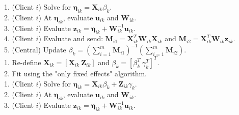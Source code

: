 \documentclass[
  12pt,
]{article}
\begin{document}
\begin{algorithm}[H]
   {
     {
         {
             {
                1. (Client $i$) Solve for $\boldsymbol{\eta}_{ik} = \boldsymbol{X}_{ik} \beta_k$. \\
                2. (Client $i$) At $\boldsymbol{\eta}_{ik}$, evaluate $\boldsymbol{u}_{ik}$ and $\boldsymbol{W}_{ik}$. \\
                3. (Client $i$) Evaluate $\boldsymbol{z}_{ik} = \boldsymbol{\eta}_{ik} + \boldsymbol{W}_{ik}^{-1} \boldsymbol{u}_{ik}$. \\
                4. (Client $i$) Evaluate and send: $\boldsymbol{M}_{i1} = \boldsymbol{X}_{ik}^T \boldsymbol{W}_{ik} \boldsymbol{X}_{ik}$ and $\boldsymbol{M}_{i2} = \boldsymbol{X}_{ik}^T 
 \boldsymbol{W}_{ik} \boldsymbol{z}_{ik}$. \\
                5. (Central) Update $\beta_k = (\sum_{i = 1}^m\boldsymbol{M}_{i1})^{-1}(\sum_{i = 1}^m\boldsymbol{M}_{i2})$. \\ 
            }
             {
                1. Re-define $\boldsymbol{X}_{ik} = [\boldsymbol{X}_{ik} \: \boldsymbol{Z}_{ik}]$ and $\beta_k = [\beta_k^T \: \gamma_k^T]^T$. \\
                2. Fit using the "only fixed effects" algorithm. \\
            }
             {
                1. (Client $i$) Solve for $\boldsymbol{\eta}_{ik} = \boldsymbol{X}_{ik} \beta_k + \boldsymbol{Z}_{ik} \gamma_k$. \\
                2. (Client $i$) At $\boldsymbol{\eta}_{ik}$, evaluate $\boldsymbol{u}_{ik}$ and $\boldsymbol{W}_{ik}$. \\
                3. (Client $i$) Evaluate $\boldsymbol{z}_{ik} = \boldsymbol{\eta}_{ik} + \boldsymbol{W}_{ik}^{-1} \boldsymbol{u}_{ik}$. \\
}}}}
\end{algorithm}
\end{document}
